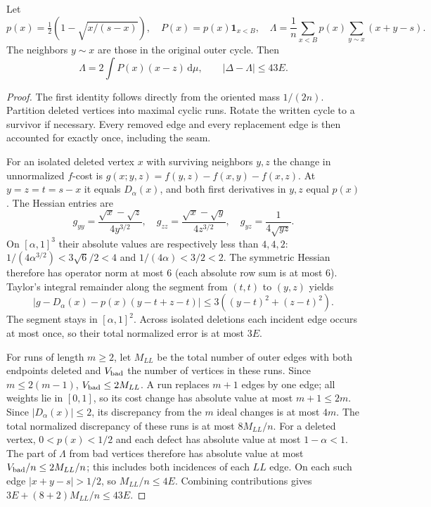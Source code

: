 \documentclass[review,supplement,hidelinks,onefignum,onetabnum]{siamart251216}
\newcommand{\ind}{\mathbf 1}
\newcommand{\dd}{\,\mathrm d}
\begin{document}
\begin{lemma}\label{lem:variation}
Let
\[
p(x)=\tfrac12\left(1-\sqrt{x/(s-x)}\right),\quad
P(x)=p(x)\ind_{x<B},\quad
\Lambda=\frac1n\sum_{x<B}p(x)\sum_{y\sim x}(x+y-s).
\]
The neighbors $y\sim x$ are those in the original outer cycle. Then
\begin{equation}\label{eq:43}
\Lambda=2\int P(x)(x-z)\dd\mu,\qquad
|\Delta-\Lambda|\le43E.
\end{equation}
\end{lemma}
\begin{proof}
The first identity follows directly from the oriented mass $1/(2n)$.
Partition deleted vertices into maximal cyclic runs. Rotate the written
cycle to a survivor if necessary. Every removed edge and every replacement
edge is then accounted for exactly once, including the seam.

For an isolated deleted vertex $x$ with surviving neighbors $y,z$ the
change in unnormalized $f$-cost is
$g(x;y,z)=f(y,z)-f(x,y)-f(x,z)$. At $y=z=t=s-x$ it equals
$D_\alpha(x)$, and both first derivatives in $y,z$ equal $p(x)$.
The Hessian entries are
\[
g_{yy}=\frac{\sqrt{x}-\sqrt z}{4y^{3/2}},\quad
g_{zz}=\frac{\sqrt{x}-\sqrt y}{4z^{3/2}},\quad
g_{yz}=\frac1{4\sqrt{yz}}.
\]
On $[\alpha,1]^3$ their absolute values are respectively less than
$4,4,2$: $1/(4\alpha^{3/2})<3\sqrt6/2<4$ and
$1/(4\alpha)<3/2<2$. The symmetric Hessian therefore has operator
norm at most $6$ (each absolute row sum is at most $6$). Taylor's
integral remainder along the segment from $(t,t)$ to $(y,z)$ yields
\[
|g-D_\alpha(x)-p(x)(y-t+z-t)|
\le3((y-t)^2+(z-t)^2).
\]
The segment stays in $[\alpha,1]^2$. Across isolated deletions each
incident edge occurs at most once, so their total normalized error is
at most $3E$.

For runs of length $m\ge2$, let $M_{LL}$ be the total number of outer
edges with both endpoints deleted and $V_{\rm bad}$ the number of
vertices in these runs. Since $m\le2(m-1)$,
$V_{\rm bad}\le2M_{LL}$. A run replaces $m+1$ edges by one edge;
all weights lie in $[0,1]$, so its cost change has absolute value at
most $m+1\le2m$. Since $|D_\alpha(x)|\le2$, its discrepancy from
the $m$ ideal changes is at most $4m$. The total normalized discrepancy
of these runs is at most $8M_{LL}/n$.
For a deleted vertex, $0<p(x)<1/2$ and each defect has absolute value
at most $1-\alpha<1$. The part of $\Lambda$ from bad vertices therefore
has absolute value at most $V_{\rm bad}/n\le2M_{LL}/n$; this includes
both incidences of each $LL$ edge. On each such edge
$|x+y-s|>1/2$, so $M_{LL}/n\le4E$. Combining contributions gives
$3E+(8+2)M_{LL}/n\le43E$.
\end{proof}
\end{document}

